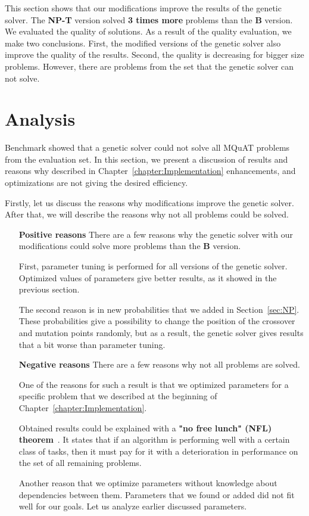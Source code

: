This section shows that our modifications improve the results of the genetic solver. The \textbf{NP-T} version solved \textbf{3 times more} problems than the \textbf{B} version. We evaluated the quality of solutions. As a result of the quality evaluation, we make two conclusions. First, the modified versions of the genetic solver also improve the quality of the results. Second, the quality is decreasing for bigger size problems.
However, there are problems from the set that the genetic solver can not solve.


\section{Analysis}

Benchmark showed that a genetic solver could not solve all MQuAT problems from the evaluation set.
In this section, we present a discussion of results and reasons why described in Chapter~\ref{chapter:Implementation} enhancements, and optimizations are not giving the desired efficiency.

Firstly, let us discuss the reasons why modifications improve the genetic solver. After that, we will describe the reasons why not all problems could be solved.

\begin{itemize}
	\item[\textbf{Positive reasons}] There are a few reasons why the genetic solver with our modifications could solve more problems than the \textbf{B} version. 
	
	First, parameter tuning is performed for all versions of the genetic solver. Optimized values of parameters give better results, as it showed in the previous section. 
	
	The second reason is in new probabilities that we added in Section~\ref{sec:NP}. These probabilities give a possibility to change the position of the crossover and mutation points randomly, but as a result, the genetic solver gives results that a bit worse than parameter tuning. 
	\item[\textbf{Negative reasons}] There are a few reasons why not all problems are solved.
	
	One of the reasons for such a result is that we optimized parameters for a specific problem that we described at the beginning of Chapter~\ref{chapter:Implementation}.
	
	Obtained results could be explained with a \textbf{"no free lunch" (NFL) theorem}~\cite{wolpert1996, wolpert1997}. It states that if an algorithm is performing well with a certain class of tasks, then it must pay for it with a deterioration in performance on the set of all remaining problems.
	
	Another reason that we optimize parameters without knowledge about dependencies between them. Parameters that we found or added did not fit well for our goals. Let us analyze earlier discussed parameters.
\end{itemize}

